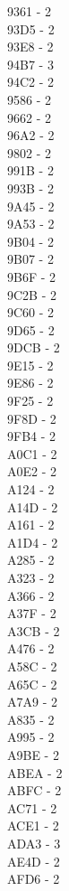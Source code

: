 \documentclass[10pt,letterpaper]{article}
\begin{document}
9361 -  2\\
93D5 -  2\\
93E8 -  2\\
94B7 -  3\\
94C2 -  2\\
9586 -  2\\
9662 -  2\\
96A2 -  2\\
9802 -  2\\
991B -  2\\
993B -  2\\
9A45 -  2\\
9A53 -  2\\
9B04 -  2\\
9B07 -  2\\
9B6F -  2\\
9C2B -  2\\
9C60 -  2\\
9D65 -  2\\
9DCB -  2\\
9E15 -  2\\
9E86 -  2\\
9F25 -  2\\
9F8D -  2\\
9FB4 -  2\\
A0C1 -  2\\
A0E2 -  2\\
A124 -  2\\
A14D -  2\\
A161 -  2\\
A1D4 -  2\\
A285 -  2\\
A323 -  2\\
A366 -  2\\
A37F -  2\\
A3CB -  2\\
A476 -  2\\
A58C -  2\\
A65C -  2\\
A7A9 -  2\\
A835 -  2\\
A995 -  2\\
A9BE -  2\\
ABEA -  2\\
ABFC -  2\\
AC71 -  2\\
ACE1 -  2\\
ADA3 -  3\\
AE4D -  2\\
AFD6 -  2\\
\end{document}
